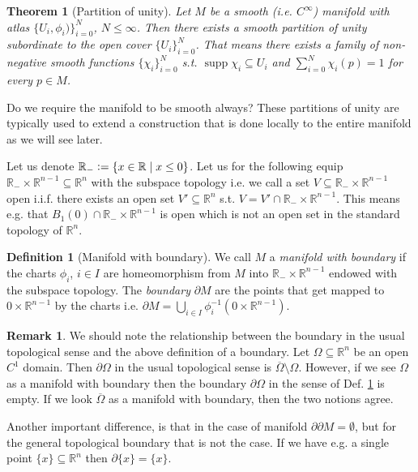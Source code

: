 \documentclass[12pt,a4paper]{article}
\numberwithin{equation}{subsection}
\numberwithin{lemma}{subsection}
\newtheorem{theorem}[lemma]{Theorem}
\theoremstyle{definition}
\newtheorem{definition}[lemma]{Definition}
\newtheorem{remark}[lemma]{Remark}
\DeclareMathOperator{\supp}{supp}
\newcommand{\real}{\mathbb{R}}
\begin{document}
\begin{theorem}[Partition of unity]
    Let $M$ be a smooth (i.e. $C^\infty$) manifold with atlas 
    $\{U_i, \phi_i)\}_{i=0}^N$, $N \leq \infty$. Then there exists a smooth
    partition of unity subordinate to the open cover $\{U_i\}_{i=0}^N$.
    That means there exists a family of non-negative smooth functions $\{ \chi_i \}_{i=0}^N$
    s.t. $\supp \chi_i \subseteq U_i$ and $\sum_{i=0}^N \chi_i(p) = 1$ 
    for every $p \in M$.
\end{theorem}
{\color{red} Do we require the manifold to be smooth always?}
These partitions of unity are typically used to extend a construction that 
is done locally to the entire manifold as we will see later.

Let us denote $\real_- \vcentcolon= \{ x \in \real \mid x \leq 0 \}$. 
Let us for the following equip $\real_- \times \real^{n-1} \subseteq \real^n$ with the 
subspace topology i.e. we call a set $V \subseteq \real_- \times \real^{n-1}$ 
open i.i.f. there exists an open set $V' \subseteq \real^n$ s.t. 
$V = V' \cap \real_- \times \real^{n-1}$. This means e.g. that 
$B_1(0) \cap \real_- \times \real^{n-1}$ is open which is not an open set 
in the standard topology of $\real^n$.
\begin{definition}[Manifold with boundary]\label{def:manifold_with_boundary}
    We call $M$ a \textit{manifold with boundary} if the charts $\phi_i$, 
    $i\in I$ are homeomorphism from $M$ into $\real_- \times \real^{n-1}$ 
    endowed with the subspace topology. The \textit{boundary} 
    $\partial M$ are the points that get mapped to ${0} \times \real^{n-1}$ 
    by the charts i.e. $\partial M = \bigcup_{i\in I} \phi_i^{-1}({0} \times \real^{n-1})$.
\end{definition}

\begin{remark}
    We should note the relationship between the boundary in the usual topological sense 
    and the above definition of a boundary. Let $\Omega \subseteq \real^n$ be 
    an open $C^1$ domain. Then $\partial \Omega$ in the usual topological sense 
    is $\overline{\Omega} \setminus \Omega$. However, if we see $\Omega$ 
    as a manifold with boundary then the boundary $\partial \Omega$ in the sense of 
    Def. \ref{def:manifold_with_boundary} is empty. If we look 
    $\overline{\Omega}$ as a manifold with boundary, then the two notions agree.   

    Another important difference, is that in the case of manifold $\partial \partial M = \emptyset$,
    but for the general topological boundary that is not the case. If we have e.g. a single 
    point $\{ x \} \subseteq \real^n$ then $\partial \{x \} = \{ x \}$.   
\end{remark}
\end{document}
